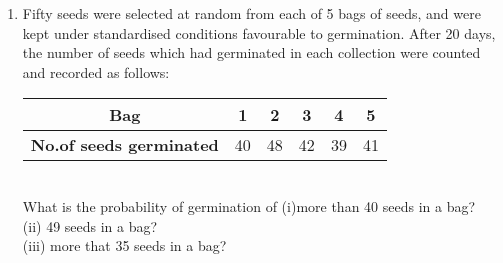 \documentclass[journal,12pt,twocolumn]{IEEEtran}
\begin{document}
\begin{enumerate}[label=\arabic*]
(i) Find the probability that the weight of a student in the class lies in the interval 46-50 kg.\\
(ii) Give two events in this context, one having probability 0 and the other having probability 1.\\

\item Fifty seeds were selected at random from each of 5 bags of seeds, and were kept under standardised conditions favourable to germination. After 20 days, the
number of seeds which had germinated in each collection were counted and recorded as follows:\\

\begin{tabular}{ |c|c|c|c|c|c| } 
 \hline
 \textbf{Bag} &1 &2 &3 &4 &5\\ 
 \hline
\textbf{No.of seeds germinated} &40 &48 &42 &39 &41 \\ 
 \hline
\end{tabular}\\

What is the probability of germination of
(i)more than 40 seeds in a bag?\\
(ii) 49 seeds in a bag?\\
(iii) more that 35 seeds in a bag?\\





\end{enumerate}
\end{document}
